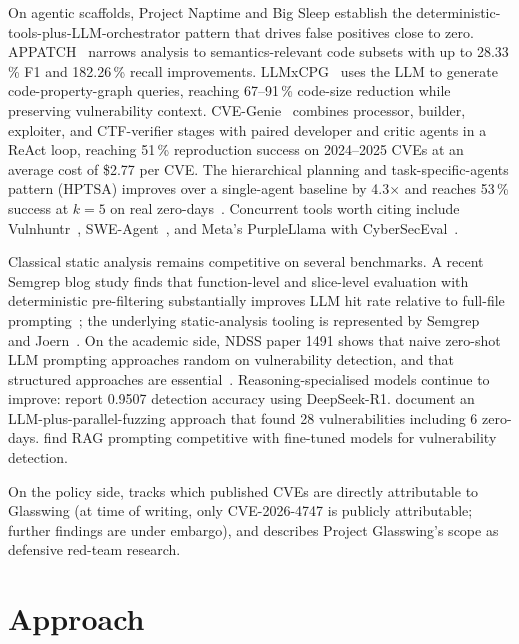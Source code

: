 \documentclass[11pt,a4paper]{article}
\begin{document}
On agentic scaffolds, Project Naptime and Big Sleep
\citep{projectzeroNaptime2024,projectzeroBigSleep2024} establish the
deterministic-tools-plus-LLM-orchestrator pattern that drives false
positives close to zero. APPATCH~\citep{appatch2025} narrows analysis to
semantics-relevant code subsets with up to 28.33\,\% F1 and 182.26\,\%
recall improvements. LLMxCPG~\citep{llmxcpg2025} uses the LLM to generate
code-property-graph queries, reaching 67--91\,\% code-size reduction while
preserving vulnerability context. CVE-Genie~\citep{cvegenie2025} combines
processor, builder, exploiter, and CTF-verifier stages with paired
developer and critic agents in a ReAct loop, reaching 51\,\% reproduction
success on 2024--2025 CVEs at an average cost of \$2.77 per CVE. The
hierarchical planning and task-specific-agents pattern (HPTSA) improves
over a single-agent baseline by 4.3$\times$ and reaches 53\,\% success at
$k{=}5$ on real zero-days~\citep{hptsa2024}. Concurrent tools worth citing
include Vulnhuntr~\citep{vulnhuntr2024}, SWE-Agent~\citep{sweagent2024}, and
Meta's PurpleLlama with CyberSecEval~\citep{purplelama2024}.

Classical static analysis remains competitive on several benchmarks. A
recent Semgrep blog study finds that function-level and slice-level
evaluation with deterministic pre-filtering substantially improves LLM
hit rate relative to full-file prompting~\citep{semgrepNeedles2026}; the
underlying static-analysis tooling is represented by
Semgrep~\citep{semgrep} and Joern~\citep{joern}. On the academic side,
NDSS paper 1491 shows that naive zero-shot LLM prompting approaches random
on vulnerability detection, and that structured approaches are
essential~\citep{ndss2025}. Reasoning-specialised models continue to
improve: \citet{deepseekR1Vuln2025} report 0.9507 detection accuracy using
DeepSeek-R1. \citet{fuzzingBrain2025} document an LLM-plus-parallel-fuzzing
approach that found 28 vulnerabilities including 6 zero-days.
\citet{promptVsFT2025} find RAG prompting competitive with fine-tuned
models for vulnerability detection.

On the policy side, \citet{vulncheckGlasswing2026} tracks which published
CVEs are directly attributable to Glasswing (at time of writing, only
CVE-2026-4747 is publicly attributable; further findings are under embargo),
and \citet{anthropicGlasswing2026} describes Project Glasswing's scope as
defensive red-team research.

\section{Approach}
\label{sec:approach}
\end{document}
